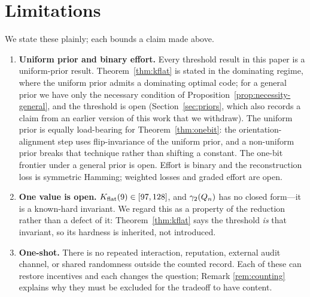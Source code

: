 \section{Limitations}
\label{sec:limitations}

We state these plainly; each bounds a claim made above.

\begin{enumerate}
\item \textbf{Uniform prior and binary effort.} Every threshold result in this
      paper is a uniform-prior result. Theorem~\ref{thm:kflat} is stated in the
      dominating regime, where the uniform prior admits a dominating optimal
      code; for a general prior we have only the necessary condition of
      Proposition~\ref{prop:necessity-general}, and the threshold is open
      (Section~\ref{sec:priors}, which also records a claim from an earlier
      version of this work that we withdraw). The uniform prior is equally
      load-bearing for
      Theorem~\ref{thm:onebit}: the orientation-alignment step uses
      flip-invariance of the uniform prior, and a non-uniform prior breaks that
      technique rather than shifting a constant. The one-bit frontier under a
      general prior is open. Effort is binary and the reconstruction loss is
      symmetric Hamming; weighted losses and graded effort are open.

\item \textbf{One value is open.} $K_{\mathrm{flat}}(9) \in [97,128]$, and
      $\gamma_2(Q_n)$ has no closed form---it is a known-hard invariant. We regard
      this as a property of the reduction rather than a defect of it:
      Theorem~\ref{thm:kflat} says the threshold \emph{is} that invariant, so its
      hardness is inherited, not introduced.

\item \textbf{One-shot.} There is no repeated interaction, reputation, external
      audit channel, or shared randomness outside the counted record. Each of
      these can restore incentives and each changes the question; Remark
      \ref{rem:counting} explains why they must be excluded for the tradeoff to
      have content.


\end{enumerate}
